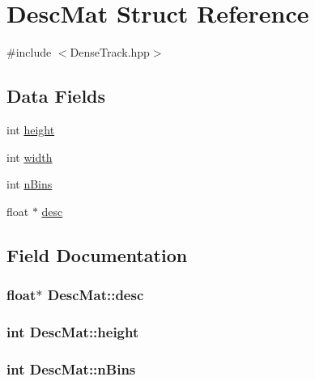 \hypertarget{structDescMat}{}\section{Desc\+Mat Struct Reference}
\label{structDescMat}


{\ttfamily \#include $<$Dense\+Track.\+hpp$>$}

\subsection*{Data Fields}
\begin{DoxyCompactItemize}
\item 
int \hyperlink{structDescMat_aff048172ecf83cd5bf560dcee659587b}{height}
\item 
int \hyperlink{structDescMat_aeddd5ec25bb3e937e94b0d0c8b639618}{width}
\item 
int \hyperlink{structDescMat_ac632ac4453de96d5fdb167b18e941ec7}{n\+Bins}
\item 
float $\ast$ \hyperlink{structDescMat_a0733b5ba5eb642191ae2bc2d370ca69e}{desc}
\end{DoxyCompactItemize}


\subsection{Field Documentation}
\hypertarget{structDescMat_a0733b5ba5eb642191ae2bc2d370ca69e}{}
\subsubsection[{desc}]{\setlength{\rightskip}{0pt plus 5cm}float$\ast$ Desc\+Mat\+::desc}\label{structDescMat_a0733b5ba5eb642191ae2bc2d370ca69e}
\hypertarget{structDescMat_aff048172ecf83cd5bf560dcee659587b}{}
\subsubsection[{height}]{\setlength{\rightskip}{0pt plus 5cm}int Desc\+Mat\+::height}\label{structDescMat_aff048172ecf83cd5bf560dcee659587b}
\hypertarget{structDescMat_ac632ac4453de96d5fdb167b18e941ec7}{}
\subsubsection[{n\+Bins}]{\setlength{\rightskip}{0pt plus 5cm}int Desc\+Mat\+::n\+Bins}\label{structDescMat_ac632ac4453de96d5fdb167b18e941ec7}
\hypertarget{structDescMat_aeddd5ec25bb3e937e94b0d0c8b639618}{}
